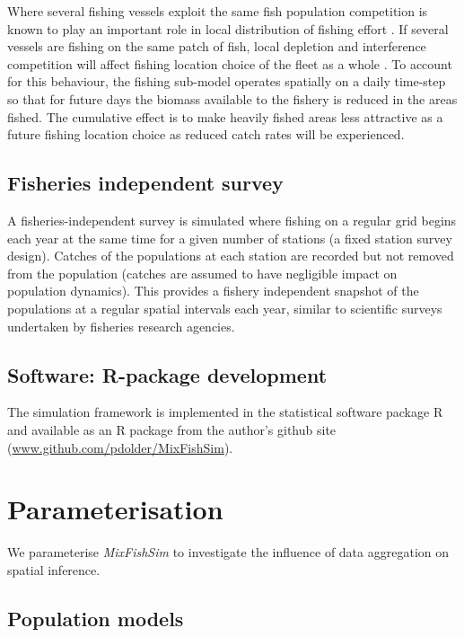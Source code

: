 \documentclass[review]{elsarticle}
\begin{document}
Where several fishing vessels exploit the same fish population competition is
known to play an important role in local distribution of fishing effort
\citep{Gillis1998}. If several vessels are fishing on the same patch of fish,
local depletion and interference competition will affect fishing location
choice of the fleet as a whole \citep{Rijnsdorp2000, Poos2007a}.  To account
for this behaviour, the fishing sub-model operates spatially on a daily
time-step so that for future days the biomass available to the fishery is
reduced in the areas fished. The cumulative effect is to make heavily fished
areas less attractive as a future fishing location choice as reduced catch
rates will be experienced. 

\subsection{Fisheries independent survey}

A fisheries-independent survey is simulated where fishing on a regular grid
begins each year at the same time for a given number of stations (a fixed
station survey design). Catches of the populations at each station are recorded
but not removed from the population (catches are assumed to have negligible
impact on population dynamics). This provides a fishery independent snapshot of
the populations at a regular spatial intervals each year, similar to scientific
surveys undertaken by fisheries research agencies. \\

\subsection{Software: R-package development}

The simulation framework is implemented in the statistical software package R
\citep{RCoreTeam2017} and available as an R package from the author's github
site (\url{www.github.com/pdolder/MixFishSim}).\\

\section{Parameterisation}
We parameterise \textit{MixFishSim} to investigate the influence of data
aggregation on spatial inference.

\subsection{Population models}
\end{document}
